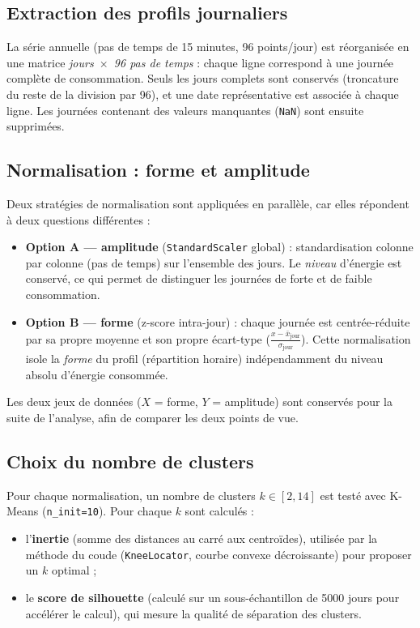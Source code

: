 \documentclass[11pt,a4paper]{article}
\newcommand{\code}[1]{\texttt{#1}}
\begin{document}
\subsection{Extraction des profils journaliers}

La série annuelle (pas de temps de 15 minutes, 96 points/jour) est réorganisée en une matrice
\emph{jours~$\times$~96 pas de temps} : chaque ligne correspond à une journée complète de
consommation. Seuls les jours complets sont conservés (troncature du reste de la division
par 96), et une date représentative est associée à chaque ligne. Les journées contenant des
valeurs manquantes (\code{NaN}) sont ensuite supprimées.

\subsection{Normalisation : forme et amplitude}

Deux stratégies de normalisation sont appliquées en parallèle, car elles répondent à deux
questions différentes :

\begin{itemize}
    \item \textbf{Option A --- amplitude} (\code{StandardScaler} global) : standardisation
    colonne par colonne (pas de temps) sur l'ensemble des jours. Le \emph{niveau} d'énergie est
    conservé, ce qui permet de distinguer les journées de forte et de faible consommation.
    \item \textbf{Option B --- forme} (z-score intra-jour) : chaque journée est centrée-réduite
    par sa propre moyenne et son propre écart-type
    ($\frac{x - \bar{x}_{\text{jour}}}{\sigma_{\text{jour}}}$). Cette normalisation isole la
    \emph{forme} du profil (répartition horaire) indépendamment du niveau absolu d'énergie
    consommée.
\end{itemize}

Les deux jeux de données ($X$ = forme, $Y$ = amplitude) sont conservés pour la suite de
l'analyse, afin de comparer les deux points de vue.

\subsection{Choix du nombre de clusters}

Pour chaque normalisation, un nombre de clusters $k \in [2, 14]$ est testé avec K-Means
(\code{n\_init=10}). Pour chaque $k$ sont calculés :

\begin{itemize}
    \item l'\textbf{inertie} (somme des distances au carré aux centroïdes), utilisée par la
    méthode du coude (\code{KneeLocator}, courbe convexe décroissante) pour proposer un
    $k$ optimal ;
    \item le \textbf{score de silhouette} (calculé sur un sous-échantillon de 5000 jours pour
    accélérer le calcul), qui mesure la qualité de séparation des clusters.
\end{itemize}
\end{document}
